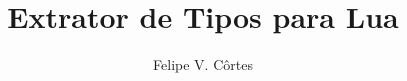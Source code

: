 \documentclass[mscr,american]{thesispuc}%
\author{Felipe V. Côrtes}
\title{Extrator de Tipos para Lua} %
\begin{document}
  
  \arial
   
\end{document}
